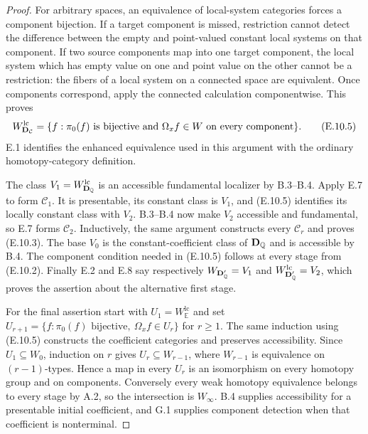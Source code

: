\begin{proof}
For arbitrary spaces, an equivalence of local-system categories
forces a component bijection. If a target component is missed,
restriction cannot detect the difference between the empty and
point-valued constant local systems on that component. If two
source components map into one target component, the local system
which has empty value on one and point value on the other cannot
be a restriction: the fibers of a local system on a connected
space are equivalent. Once components correspond, apply the
connected calculation componentwise. This proves
\[
 W_{\mathbf D_{\mathcal C}}^{\mathrm{lc}}
   =\{f:\pi_0(f)\text{ is bijective and }
                   \Omega_x f\in W\text{ on every component}\}.
 \tag{E.10.5}
\]
E.1 identifies the enhanced equivalence used in this argument with
the ordinary homotopy-category definition.

The class $V_1=W_{\mathbf D_\mathbb Q}^{\mathrm{lc}}$ is an accessible
fundamental localizer by B.3--B.4. Apply E.7 to form
$\mathcal C_1$. It is presentable, its constant class is $V_1$,
and (E.10.5) identifies its locally constant class with $V_2$.
B.3--B.4 now make $V_2$ accessible and fundamental, so E.7 forms
$\mathcal C_2$. Inductively, the same argument constructs every
$\mathcal C_r$ and proves (E.10.3). The base $V_0$ is the
constant-coefficient class of $\mathbf D_\mathbb Q$ and is accessible by B.4.
The component condition needed in (E.10.5) follows at every stage
from (E.10.2). Finally E.2 and E.8 say respectively
$W_{\mathbf D'_\mathbb Q}=V_1$ and $W_{\mathbf D'_\mathbb Q}^{\mathrm{lc}}=V_2$,
which proves the assertion about the alternative first stage.

For the final assertion start with
$U_1=W_{\mathbb E}^{\mathrm{lc}}$ and set
$U_{r+1}=\{f:\pi_0(f)\text{ bijective},\ \Omega_xf\in U_r\}$
for $r\ge1$. The same induction using (E.10.5) constructs the
coefficient categories and preserves accessibility. Since
$U_1\subseteq W_0$, induction on $r$ gives
$U_r\subseteq W_{r-1}$, where $W_{r-1}$ is equivalence on
$(r-1)$-types. Hence a map in every $U_r$ is an isomorphism on
every homotopy group and on components. Conversely every weak
homotopy equivalence belongs to every stage by A.2, so the
intersection is $W_\infty$. B.4 supplies accessibility for a
presentable initial coefficient, and G.1 supplies component
detection when that coefficient is nonterminal.
\end{proof}

